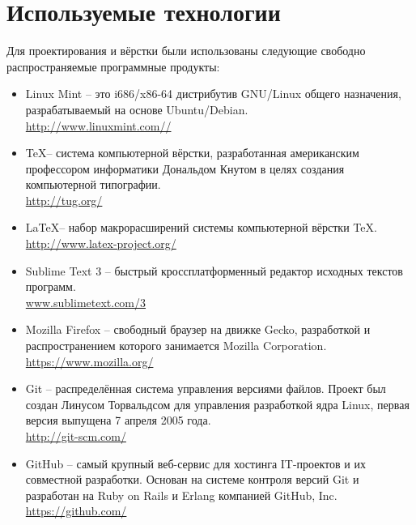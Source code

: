 \documentclass[a4paper, 14pt]{extreport}
\begin{document}
    \chapter{Используемые технологии}
    Для проектирования и вёрстки были использованы следующие свободно распространяемые программные 
    продукты:
    \begin{itemize}
        \item Linux Mint -- это i686/x86-64 дистрибутив GNU/Linux общего 
            назначения, разрабатываемый на основе Ubuntu/Debian.\\
            \url{http://www.linuxmint.com//}
        \item \TeX -- система компьютерной вёрстки, разработанная американским профессором информатики 
            Дональдом Кнутом в целях создания компьютерной типографии.\\
            \url{http://tug.org/}
        \item \LaTeX -- набор макрорасширений системы компьютерной вёрстки TeX.\\
            \url{http://www.latex-project.org/}
        \item Sublime Text 3 -- быстрый кроссплатформенный редактор исходных текстов программ.\\
            \url{www.sublimetext.com/3}
            
        \item Mozilla Firefox -- свободный браузер на движке Gecko, разработкой и распространением 
            которого занимается Mozilla Corporation.\\
            \url{https://www.mozilla.org/}
        \item Git -- распределённая система управления версиями файлов. Проект был создан Линусом 
            Торвальдсом для управления разработкой ядра Linux, первая версия выпущена 7 апреля 2005 года.\\
            \url{http://git-scm.com/}
        \item GitHub -- самый крупный веб-сервис для хостинга IT-проектов и их совместной разработки. 
            Основан на системе контроля версий Git и разработан на Ruby on Rails и Erlang компанией 
            GitHub, Inc.\\
            \url{https://github.com/}
    \end{itemize}
\end{document}

